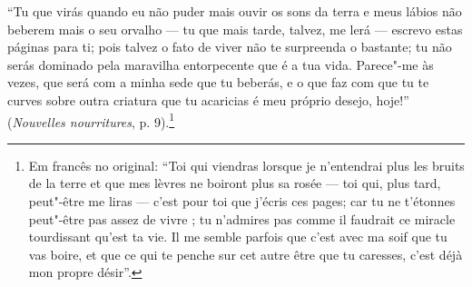 ``Tu que virás quando eu não puder mais ouvir os sons da terra e meus
lábios não beberem mais o seu orvalho --- tu que mais tarde, talvez, me
lerá --- escrevo estas páginas para ti; pois talvez o fato de viver não te
surpreenda o bastante; tu não serás dominado pela maravilha entorpecente
que é a tua vida. Parece"-me às vezes, que será com a minha sede que tu
beberás, e o que faz com que tu te curves sobre outra criatura que tu
acaricias é meu próprio desejo, hoje!'' (\emph{Nouvelles nourritures}, p. 
9).\footnote{Em francês no original: ``Toi qui viendras lorsque je
  n'entendrai plus les bruits de la terre et que mes lèvres ne boiront
  plus sa rosée --- toi qui, plus tard, peut"-être me liras --- c'est pour
  toi que j'écris ces pages; car tu ne t'étonnes peut"-être pas assez de
  vivre ; tu n'admires pas comme il faudrait ce miracle tourdissant
  qu'est ta vie. Il me semble parfois que c'est avec ma soif que tu vas \enlargethispage{\baselineskip}
  boire, et que ce qui te penche sur cet autre être que tu caresses,
  c'est déjà mon propre désir''. \versal{[N.~T.]}} \enlargethispage{-\baselineskip}
